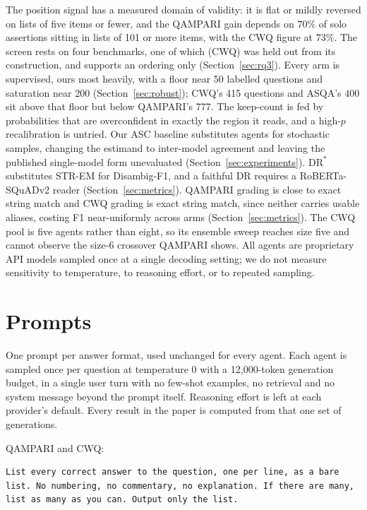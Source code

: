 \documentclass{article}
\begin{document}
The position signal has a measured domain of validity: it is flat or mildly reversed on lists of five items or fewer, and the QAMPARI gain depends on $70\%$ of solo assertions sitting in lists of 101 or more items, with the CWQ figure at $73\%$. The screen rests on four benchmarks, one of which (CWQ) was held out from its construction, and supports an ordering only (Section~\ref{sec:rq3}). Every arm is supervised, ours most heavily, with a floor near 50 labelled questions and saturation near 200 (Section~\ref{sec:robust}); CWQ's 415 questions and ASQA's 400 sit above that floor but below QAMPARI's 777. The keep-count is fed by probabilities that are overconfident in exactly the region it reads, and a high-$p$ recalibration is untried. Our ASC baseline substitutes agents for stochastic samples, changing the estimand to inter-model agreement and leaving the published single-model form unevaluated (Section~\ref{sec:experiments}). $\mathrm{DR}^*$ substitutes STR-EM for Disambig-F1, and a faithful DR requires a RoBERTa-SQuADv2 reader (Section~\ref{sec:metrics}). QAMPARI grading is close to exact string match and CWQ grading is exact string match, since neither carries usable aliases, costing F1 near-uniformly across arms (Section~\ref{sec:metrics}). The CWQ pool is five agents rather than eight, so its ensemble sweep reaches size five and cannot observe the size-6 crossover QAMPARI shows. All agents are proprietary API models sampled once at a single decoding setting; we do not measure sensitivity to temperature, to reasoning effort, or to repeated sampling.

\section{Prompts}
\label{app:prompts}

One prompt per answer format, used unchanged for every agent. Each agent is sampled once per question at temperature 0 with a 12,000-token generation budget, in a single user turn with no few-shot examples, no retrieval and no system message beyond the prompt itself. Reasoning effort is left at each provider's default. Every result in the paper is computed from that one set of generations.

QAMPARI and CWQ:
\begin{verbatim}
List every correct answer to the question, one per line, as a bare
list. No numbering, no commentary, no explanation. If there are many,
list as many as you can. Output only the list.
\end{verbatim}
\end{document}
